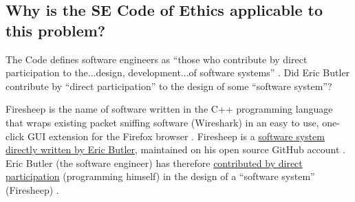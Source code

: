 \documentclass[11pt]{article}
\begin{document}
\begin{multicols}{2}


\subsection{Why is the SE Code of Ethics applicable to this problem?}
The Code defines software engineers as ``those who contribute by direct participation to the...design, development...of software systems'' \cite{se-code}. Did Eric Butler contribute by ``direct participation'' to the design of some ``software system''?

Firesheep is the name of software written in the C++ programming language that wraps existing packet sniffing software (Wireshark) in an easy to use, one-click GUI extension for the Firefox browser \cite{firesheep-source}. Firesheep is a \uline{software system directly written by Eric Butler}, maintained on his open source GitHub account \cite{firesheep-source}. Eric Butler (the software engineer) has therefore \uline{contributed by direct participation} (programming himself) in the design of a ``software system'' (Firesheep) \cite{firesheep-source}.


\end{multicols}
\end{document}
